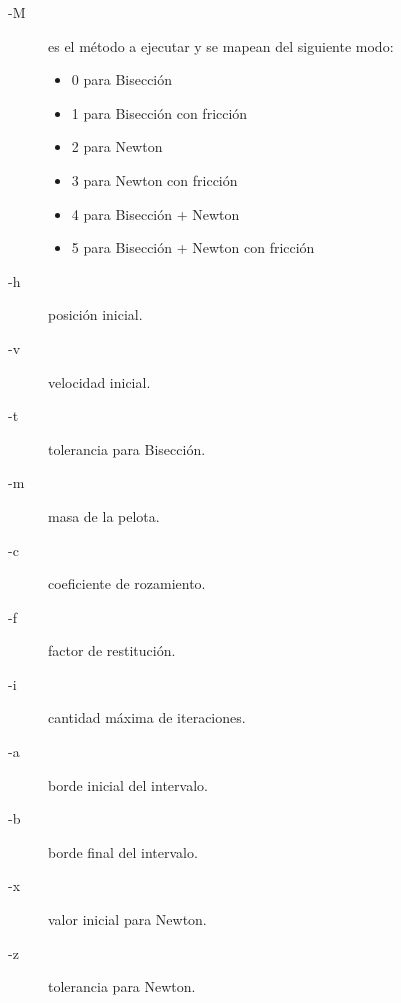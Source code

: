 \documentclass[a4paper]{article}
\begin{document}
\begin{description}
\item[-M] es el método a ejecutar y se mapean del siguiente modo:
\begin{itemize}
  \item 0 para Bisección
  \item 1 para Bisección con fricción
  \item 2 para Newton
  \item 3 para Newton con fricción
  \item 4 para Bisección + Newton
  \item 5 para Bisección + Newton con fricción
\end{itemize}
\item[-h] posición inicial.
\item[-v] velocidad inicial.
\item[-t] tolerancia para Bisección.
\item[-m] masa de la pelota.
\item[-c] coeficiente de rozamiento.
\item[-f] factor de restitución.
\item[-i] cantidad máxima de iteraciones.
\item[-a] borde inicial del intervalo.
\item[-b] borde final del intervalo.
\item[-x] valor inicial para Newton.
\item[-z] tolerancia para Newton.
\end{description}

\newpage

\end{document}
